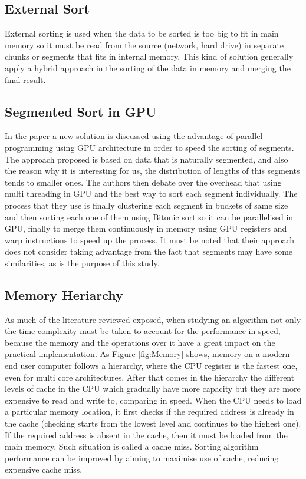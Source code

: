\documentclass[a4paper,12pt]{article}
\begin{document}
\subsection {External Sort} \label{ExternalSorting}
External sorting is used when the data to be sorted is too big to fit in main memory so it must be read from the source (network, hard drive) in separate chunks or segments that fits in internal memory. This kind of solution generally apply a hybrid approach in the sorting of the data in memory and merging the final result. 

\subsection{Segmented Sort in GPU} 
In the paper \cite{hou2017fast} a new solution is discussed using the advantage of parallel programming using GPU architecture in order to speed the sorting of segments. The approach proposed is based on data that is naturally segmented, and also the reason why it is interesting for us, the distribution of lengths of this segments tends to smaller ones. The authors then debate over the overhead that using multi threading in GPU and the best way to sort each segment individually. The process that they use is finally clustering each segment in buckets of same size and then sorting each one of them using Bitonic sort \cite{batcher1968sorting} so it can be parallelised in GPU, finally to merge them continuously in memory using GPU registers and warp instructions to speed up the process. It must be noted that their approach does not consider taking advantage from the fact that segments may have some similarities, as is the purpose of this study.

\subsection{Memory Heriarchy}
As much of the literature reviewed exposed, when studying an algorithm not only the time complexity must be taken to account for the performance in speed, because the memory and the operations over it have a great impact on the practical implementation. As Figure \ref{fig:Memory} shows, memory on a modern end user computer follows a hierarchy, where the CPU register is the fastest one, even for multi core architectures. After that comes in the hierarchy the different levels of cache in the CPU which gradually have more capacity but they are more expensive to read and write to, comparing in speed. When the CPU needs to load a particular memory location, it first checks if the required address is already in the cache (checking starts from the lowest level and continues to the highest one). If the required address is absent in the cache, then it must be loaded from the main memory. Such situation is called a cache miss. Sorting algorithm  performance can be improved by aiming to maximise use of cache, reducing expensive cache miss.
\end{document}
